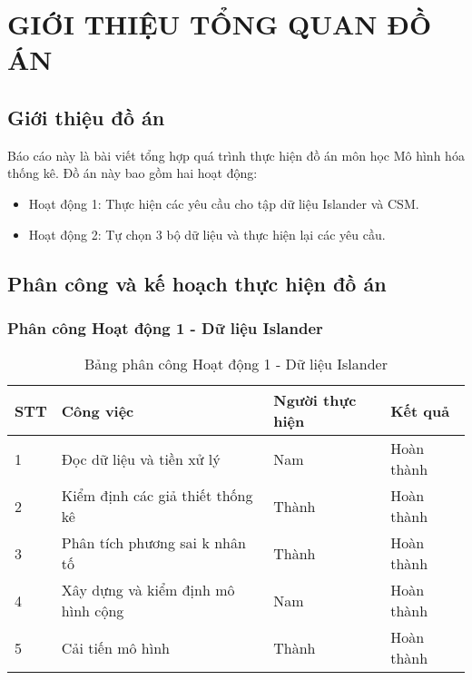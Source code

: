 \chapter{GIỚI THIỆU TỔNG QUAN ĐỒ ÁN}



\section{Giới thiệu đồ án}

Báo cáo này là bài viết tổng hợp quá trình thực hiện đồ án môn học Mô hình hóa thống kê. Đồ án này bao gồm hai hoạt động:
\begin{itemize}
    \item Hoạt động 1: Thực hiện các yêu cầu cho tập dữ liệu Islander và CSM.
    \item Hoạt động 2: Tự chọn 3 bộ dữ liệu và thực hiện lại các yêu cầu.
\end{itemize}

\section{Phân công và kế hoạch thực hiện đồ án}

\subsection{Phân công Hoạt động 1 - Dữ liệu Islander}

\begin{table}[H]
\centering
\caption{Bảng phân công Hoạt động 1 - Dữ liệu Islander}
\label{tab:phancong0}
\begin{tabular}{llll}
\hline
\multicolumn{1}{|l|}{STT} & \multicolumn{1}{l|}{Công việc}                          & \multicolumn{1}{l|}{Người thực hiện} & \multicolumn{1}{l|}{Kết quả}    \\ \hline
\multicolumn{1}{|l|}{1}   & \multicolumn{1}{l|}{Đọc dữ liệu và tiền xử lý}          & \multicolumn{1}{l|}{Nam}             & \multicolumn{1}{l|}{Hoàn thành} \\ \hline
\multicolumn{1}{|l|}{2}   & \multicolumn{1}{l|}{Kiểm định các giả thiết thống kê}   & \multicolumn{1}{l|}{Thành}           & \multicolumn{1}{l|}{Hoàn thành} \\ \hline
\multicolumn{1}{|l|}{3}   & \multicolumn{1}{l|}{Phân tích phương sai k nhân tố}     & \multicolumn{1}{l|}{Thành}           & \multicolumn{1}{l|}{Hoàn thành} \\ \hline
\multicolumn{1}{|l|}{4}   & \multicolumn{1}{l|}{Xây dựng và kiểm định mô hình cộng} & \multicolumn{1}{l|}{Nam}             & \multicolumn{1}{l|}{Hoàn thành} \\ \hline
\multicolumn{1}{|l|}{5}   & \multicolumn{1}{l|}{Cải tiến mô hình}                   & \multicolumn{1}{l|}{Thành}           & \multicolumn{1}{l|}{Hoàn thành} \\ \hline           
\end{tabular}
\end{table}

